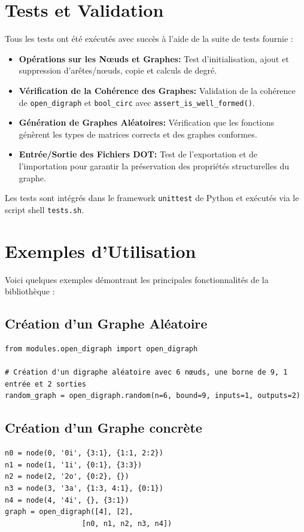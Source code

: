 \documentclass{article}
\begin{document}
\section{Tests et Validation}
Tous les tests ont été exécutés avec succès à l'aide de la suite de tests fournie :
\begin{itemize}
    \item \textbf{Opérations sur les Nœuds et Graphes:} Test d'initialisation, ajout et suppression d'arêtes/nœuds, copie et calculs de degré.
    \item \textbf{Vérification de la Cohérence des Graphes:} Validation de la cohérence de \texttt{open\_digraph} et \texttt{bool\_circ} avec \texttt{assert\_is\_well\_formed()}.
    \item \textbf{Génération de Graphes Aléatoires:} Vérification que les fonctions génèrent les types de matrices corrects et des graphes conformes.
    \item \textbf{Entrée/Sortie des Fichiers DOT:} Test de l'exportation et de l'importation pour garantir la préservation des propriétés structurelles du graphe.
\end{itemize}
Les tests sont intégrés dans le framework \texttt{unittest} de Python et exécutés via le script shell \texttt{tests.sh}.

\section{Exemples d'Utilisation}
Voici quelques exemples démontrant les principales fonctionnalités de la bibliothèque :

\subsection*{Création d'un Graphe Aléatoire}
\begin{verbatim}
from modules.open_digraph import open_digraph

# Création d'un digraphe aléatoire avec 6 nœuds, une borne de 9, 1 entrée et 2 sorties
random_graph = open_digraph.random(n=6, bound=9, inputs=1, outputs=2)
\end{verbatim}

\subsection*{Création d'un Graphe concrète}
\begin{verbatim}
n0 = node(0, '0i', {3:1}, {1:1, 2:2})
n1 = node(1, '1i', {0:1}, {3:3})
n2 = node(2, '2o', {0:2}, {})
n3 = node(3, '3a', {1:3, 4:1}, {0:1})
n4 = node(4, '4i', {}, {3:1})
graph = open_digraph([4], [2], 
                  [n0, n1, n2, n3, n4])
\end{verbatim}
\end{document}
